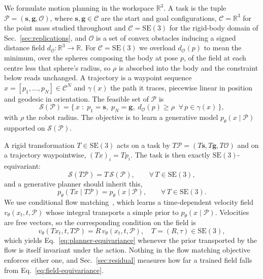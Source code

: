 \documentclass[10pt,twocolumn,letterpaper]{article}
\newcommand{\SE}{\mathrm{SE}(3)}
\newcommand{\svec}{\mathbf{s}}
\newcommand{\gvec}{\mathbf{g}}
\begin{document}
We formulate motion planning in the workspace $\mathbb{R}^3$. A task is the
tuple $\mathcal{P} = (\svec, \gvec, \mathcal{O})$, where
$\svec, \gvec \in \mathcal{C}$ are the start and goal configurations,
$\mathcal{C} = \mathbb{R}^3$ for the point mass studied throughout and
$\mathcal{C} = \SE$ for the rigid-body domain of
Sec.~\ref{sec:replications},
and $\mathcal{O}$ is a set of convex obstacles inducing a signed distance field
$d_{\mathcal{O}} : \mathbb{R}^3 \to \mathbb{R}$. For $\mathcal{C} = \SE$ we
overload $d_{\mathcal{O}}(p)$ to mean the minimum, over the spheres composing the
body at pose $p$, of the field at each centre less that sphere's radius, so
$\rho$ is absorbed into the body and the constraint below reads unchanged. A trajectory is a waypoint
sequence $x = [p_1, \dots, p_N] \in \mathcal{C}^N$ and $\gamma(x)$ the path it
traces, piecewise linear in position and geodesic in orientation. The feasible
set of $\mathcal{P}$ is
\begin{equation}
  \mathcal{S}(\mathcal{P}) =
  \big\{\, x \;:\; p_1 = \svec,\; p_N = \gvec,\;
  d_{\mathcal{O}}(p) \ge \rho \;\; \forall\, p \in \gamma(x) \,\big\},
  \label{eq:feasible}
\end{equation}
with $\rho$ the robot radius. The objective is to learn a generative model
$p_\theta(x \mid \mathcal{P})$ supported on $\mathcal{S}(\mathcal{P})$.

A rigid transformation $T \in \SE$ acts on a task by
$T\mathcal{P} = (T\svec, T\gvec, T\mathcal{O})$ and on a trajectory waypointwise,
$(Tx)_i = Tp_i$. The task is then exactly $\SE$-equivariant:
\begin{equation}
  \mathcal{S}(T\mathcal{P}) = T\,\mathcal{S}(\mathcal{P}),
  \qquad \forall\, T \in \SE ,
  \label{eq:equivariance}
\end{equation}
and a generative planner should inherit this,
\begin{equation}
  p_\theta(Tx \mid T\mathcal{P}) = p_\theta(x \mid \mathcal{P}),
  \qquad \forall\, T \in \SE .
  \label{eq:planner-equivariance}
\end{equation}
We use conditional flow matching~\cite{lipman2023fm}, which learns a
time-dependent velocity field $v_\theta(x_t, t, \mathcal{P})$ whose integral
transports a simple prior to $p_\theta(x \mid \mathcal{P})$. Velocities are free
vectors, so the corresponding condition on the field is
\begin{equation}
  v_\theta(Tx_t, t, T\mathcal{P}) = R\, v_\theta(x_t, t, \mathcal{P}),
  \quad T = (R, \tau) \in \SE ,
  \label{eq:field-equivariance}
\end{equation}
which yields Eq.~\eqref{eq:planner-equivariance} whenever the prior transported
by the flow is itself invariant under the action. Nothing in the flow matching
objective enforces either one, and Sec.~\ref{sec:residual} measures how far a
trained field falls from Eq.~\eqref{eq:field-equivariance}.
\end{document}

